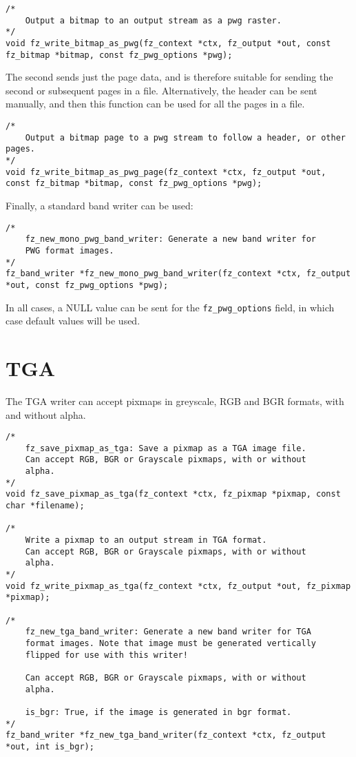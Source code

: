 \documentclass[oneside]{book}
\begin{document}
\begin{lstlisting}
/*
	Output a bitmap to an output stream as a pwg raster.
*/
void fz_write_bitmap_as_pwg(fz_context *ctx, fz_output *out, const fz_bitmap *bitmap, const fz_pwg_options *pwg);
\end{lstlisting}

The second sends just the page data, and is therefore suitable for sending the second or subsequent pages in a file. Alternatively, the header can be sent manually, and then this function can be used for all the pages in a file.

\begin{lstlisting}
/*
	Output a bitmap page to a pwg stream to follow a header, or other pages.
*/
void fz_write_bitmap_as_pwg_page(fz_context *ctx, fz_output *out, const fz_bitmap *bitmap, const fz_pwg_options *pwg);
\end{lstlisting}

Finally, a standard band writer can be used:

\begin{lstlisting}
/*
	fz_new_mono_pwg_band_writer: Generate a new band writer for
	PWG format images.
*/
fz_band_writer *fz_new_mono_pwg_band_writer(fz_context *ctx, fz_output *out, const fz_pwg_options *pwg);
\end{lstlisting}

In all cases, a NULL value can be sent for the \texttt{fz\_pwg\_options} field, in which case default values will be used.

\section{TGA}

The TGA writer can accept pixmaps in greyscale, RGB and BGR formats, with and without alpha.

\begin{lstlisting}
/*
	fz_save_pixmap_as_tga: Save a pixmap as a TGA image file.
	Can accept RGB, BGR or Grayscale pixmaps, with or without
	alpha.
*/
void fz_save_pixmap_as_tga(fz_context *ctx, fz_pixmap *pixmap, const char *filename);

/*
	Write a pixmap to an output stream in TGA format.
	Can accept RGB, BGR or Grayscale pixmaps, with or without
	alpha.
*/
void fz_write_pixmap_as_tga(fz_context *ctx, fz_output *out, fz_pixmap *pixmap);

/*
	fz_new_tga_band_writer: Generate a new band writer for TGA
	format images. Note that image must be generated vertically
	flipped for use with this writer!

	Can accept RGB, BGR or Grayscale pixmaps, with or without
	alpha.

	is_bgr: True, if the image is generated in bgr format.
*/
fz_band_writer *fz_new_tga_band_writer(fz_context *ctx, fz_output *out, int is_bgr);
\end{lstlisting}
\end{document}
